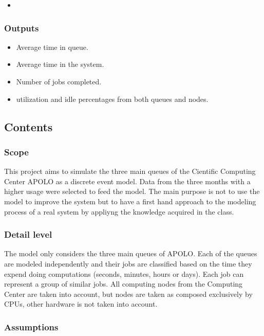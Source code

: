\documentclass{wscpaperproc}
\begin{document}
\begin{itemize}
    \item
\end{itemize}

\subsubsection{Outputs}

\begin{itemize}
    \item Average time in queue.
    \item Average time in the system.
    \item Number of jobs completed.
    \item utilization and idle percentages from both queues and nodes.
\end{itemize}

\subsection{Contents}

\subsubsection{Scope}

This project aims to simulate the three main queues of the Cientific Computing
Center APOLO as a discrete event model. Data from the three months with a higher
usage were selected to feed the model. The main purpose is not to use the model
to improve the system but to have a first hand approach to the modeling process
of a real system by appliyng the knowledge acquired in the class.

\subsubsection{Detail level}

The model only considers the three main queues of APOLO. Each of the queues are
modeled independently and their jobs are classified based on the time they
expend doing computations (seconds, minutes, hours or days).  Each job can
represent a group of similar jobs. All computing nodes from the Computing
Center are taken into account, but nodes are taken as composed exclusively by
CPUs, other hardware is not taken into account.

\subsubsection{Assumptions}
\end{document}
